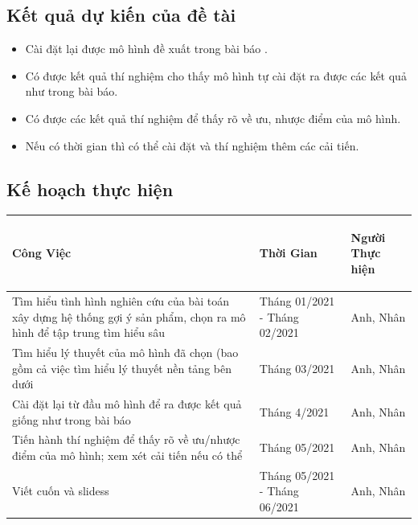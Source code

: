 \documentclass{article}[14pt]
\begin{document}
{    
    \subsection{Kết quả dự kiến của đề tài}
        
    \begin{itemize}
        \item Cài đặt lại được mô hình đề xuất trong bài báo \cite{mvae}.
        \item Có được kết quả thí nghiệm cho thấy mô hình tự cài đặt ra được 
các kết quả như trong bài báo.
        \item Có được các kết quả thí nghiệm để thấy rõ về ưu, nhược điểm 
của mô hình.
        \item Nếu có thời gian thì có thể cài đặt và thí nghiệm thêm các cải 
tiến.
    \end{itemize}
    
    \subsection{Kế hoạch thực hiện}

\begin{tabular}{ | m{20em} | m{4cm}| m{4cm} | } 

  \hline
   \centering\textbf { Công Việc} &  \centering\textbf{Thời Gian}  & 
\begin{center}
        \textbf{Người Thực hiện}   \end{center} \\ 
  \hline
  Tìm hiểu tình hình nghiên cứu của bài toán xây dựng hệ thống gợi ý sản 
phẩm, chọn ra mô hình để tập trung tìm hiểu sâu & Tháng 01/2021 - Tháng 
02/2021 & Anh, Nhân \\ 
  \hline
  Tìm hiểu lý thuyết của mô hình đã chọn (bao gồm cả việc tìm hiểu lý thuyết 
nền tảng bên dưới &  Tháng 03/2021 & Anh, Nhân \\ 
  \hline
  Cài đặt lại từ đầu mô hình để ra được kết quả giống như trong bài báo &  
Tháng 4/2021 & Anh, Nhân \\
  \hline
  Tiến hành thí nghiệm để thấy rõ về ưu/nhược điểm của mô hình; xem xét cải 
tiến nếu có thể &  Tháng 05/2021 & Anh, Nhân \\
  \hline
 Viết cuốn và slidess &  Tháng 05/2021 - Tháng 06/2021 & Anh, Nhân \\
 \hline
\end{tabular}


   
       
    
    }
    
    
    \nocite{*}
\end{document}
